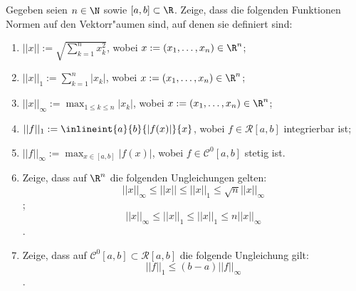 \begin{prob}
Gegeben seien $n\in\N$ sowie $[a,b]\subset\R$. Zeige, dass die folgenden Funktionen Normen auf den Vektorr"aumen sind, auf denen sie definiert sind:
\begin{enumerate}[label=(\alph*)]
\item $||x||:=\sqrt{\sum_{k=1}^n x_k^2}$, wobei $x:=(x_1,\ldots,x_n)\in\R^n$;
\item $||x||_1:=\sum_{k=1}^n |x_k|$, wobei $x:=(x_1,\ldots,x_n)\in\R^n$;
\item $||x||_\infty:=\max_{1\leq k\leq n} |x_k|$, wobei $x:=(x_1,\ldots,x_n)\in\R^n$;
\item $||f||_1:=\inlineint{a}{b}{|f(x)|}{x}$, wobei $f\in \mathcal{R}[a,b]$ integrierbar ist;
\item $||f||_\infty:=\max_{x\in[a,b]}|f(x)|$, wobei $f\in \mathcal{C}^0[a,b]$ stetig ist.
\item Zeige, dass auf $\R^n$ die folgenden Ungleichungen gelten:
$$||x||_\infty\leq||x||\leq||x||_1\leq \sqrt{n}||x||_\infty$$;
$$||x||_\infty\leq||x||_1\leq||x||_1\leq n||x||_\infty$$.
\item Zeige, dass auf $\mathcal{C}^0[a,b]\subset\mathcal{R}[a,b]$ die folgende Ungleichung gilt:
$$||f||_1\leq(b-a)||f||_\infty$$.
\end{enumerate}

\end{prob}
